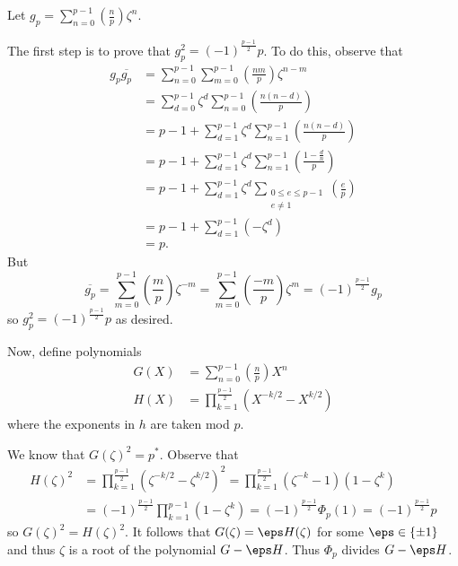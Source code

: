 Let $g_p=\displaystyle\sum_{n=0}^{p-1}\left(\frac{n}{p}\right)\zeta^n$.

The first step is to prove that $g_p^2=(-1)^{\frac{p-1}{2}}p$. To do this, observe that
\begin{align*}
	g_p\overline{g_p} &= \sum_{n=0}^{p-1}\sum_{m=0}^{p-1}\left(\frac{nm}{p}\right)\zeta^{n-m} \\
	&= \sum_{d=0}^{p-1}\zeta^d\sum_{n=0}^{p-1}\left(\frac{n(n-d)}{p}\right) \\
	&= p-1+\sum_{d=1}^{p-1}\zeta^d\sum_{n=1}^{p-1}\left(\frac{n(n-d)}{p}\right) \\
	&= p-1+\sum_{d=1}^{p-1}\zeta^d\sum_{n=1}^{p-1}\left(\frac{1-\frac{d}{n}}{p}\right) \\
	&= p-1+\sum_{d=1}^{p-1}\zeta^d\sum_{\substack{0\leq e\leq p-1 \\ e\neq1}}\left(\frac{e}{p}\right) \\
	&= p-1+\sum_{d=1}^{p-1}(-\zeta^d) \\
	&= p.
\end{align*}
But
\[
	\overline{g_p}=\sum_{m=0}^{p-1}\left(\frac{m}{p}\right)\zeta^{-m}=\sum_{m=0}^{p-1}\left(\frac{-m}{p}\right)\zeta^m=(-1)^{\frac{p-1}{2}}g_p
\]
so $g_p^2=(-1)^{\frac{p-1}{2}}p$ as desired.

Now, define polynomials
\begin{align*}
	G(X) &= \sum_{n=0}^{p-1}\left(\frac{n}{p}\right)X^n \\
	H(X) &= \prod_{k=1}^{\frac{p-1}{2}}\left(X^{-k/2}-X^{k/2}\right)
\end{align*}
where the exponents in $h$ are taken mod $p$.

We know that $G(\zeta)^2=p^*$. Observe that
\begin{align*}
	H(\zeta)^2 &= \prod_{k=1}^{\frac{p-1}{2}}\left(\zeta^{-k/2}-\zeta^{k/2}\right)^2 = \prod_{k=1}^{\frac{p-1}{2}}\left(\zeta^{-k}-1\right)\left(1-\zeta^k\right) \\
	&= (-1)^{\frac{p-1}{2}}\prod_{k=1}^{p-1}\left(1-\zeta^k\right)=(-1)^{\frac{p-1}{2}}\Phi_p(1)=(-1)^{\frac{p-1}{2}}p
\end{align*}
so $G(\zeta)^2=H(\zeta)^2$. It follows that $G(\zeta)=\eps H(\zeta)$ for some $\eps\in\{\pm1\}$ and thus $\zeta$ is a root of the polynomial $G-\eps H$. Thus $\Phi_p$ divides $G-\eps H$.

